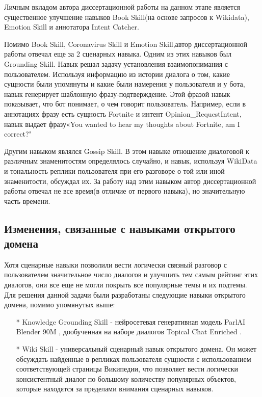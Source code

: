 Личным вкладом автора диссертационной работы на данном этапе является существенное улучшение навыков Book Skill(на основе запросов к Wikidata), Emotion Skill и аннотатора Intent Catcher. 

Помимо Book Skill, Coronavirus Skill и Emotion Skill,автор диссертационной работы отвечал еще за 2 сценарных навыка.
Одним из этих навыков был Grounding Skill. Навык решал задачу установления взаимопонимания с пользователем. Используя информацию из истории диалога о том, какие сущности были упомянуты и какие были намерения у пользователя и у бота, навык генерирует шаблонную фразу-подтверждение. Этой фразой навык показывает, что бот понимает, о чем говорит пользователь. Например, если в аннотациях фразу есть сущность Fortnite и интент Opinion\_RequestIntent, навык выдает фразу«You wanted to hear my thoughts about Fortnite, am I correct?"

Другим навыком являлся Gossip Skill. В этом навыке отношение диалоговой к различным знаменитостям определялось случайно, и навык, используя WikiData и тональность реплики пользователя при его разговоре о той или иной знаменитости, обсуждал их. За работу над этим навыком автор диссертационной работы отвечал не все время(в отличие от первого навыка), но значительную часть времени.

\subsection{Изменения, связанные с навыками открытого домена}

Хотя сценарные навыки позволили вести логически связный разговор с пользователем значительное число диалогов и улучшить тем самым рейтинг этих диалогов, они все еще не могли покрыть все популярные темы и их подтемы. Для решения данной задачи были разработаны следующие навыки открытого домена, помимо упомянутых выше:
\begin{itemize}
\item[*] Knowledge Grounding Skill - нейросетевая генеративная модель ParlAI Blender 90M \cite{roller_other_2020}, дообученная на наборе диалогов Topical Chat Enriched \cite{hedayatnia_2020}.
\item[*] Wiki Skill - универсальный сценарный навык открытого домена. Он может обсуждать найденные в репликах пользователя сущности с использованием соответствующей страницы Википедии, что позволяет вести логически консистентный диалог по большому количеству популярных объектов, которые находятся за пределами внимания сценарных навыков.
\end{itemize}
